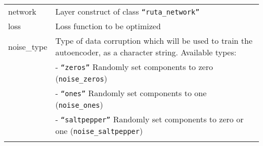 \begin{longtable}[c]{@{}>{\small}p{3cm}>{\raggedright}p{12.5cm}@{}}
\toprule
\begin{minipage}[t]{0.07\columnwidth}\raggedright\strut
network
\strut\end{minipage} &
\begin{minipage}[t]{0.87\columnwidth}\raggedright\strut
Layer construct of class \texttt{``ruta\_network''}
\strut\end{minipage}\tabularnewline
\begin{minipage}[t]{0.07\columnwidth}\raggedright\strut
loss
\strut\end{minipage} &
\begin{minipage}[t]{0.87\columnwidth}\raggedright\strut
Loss function to be optimized
\strut\end{minipage}\tabularnewline
\begin{minipage}[t]{0.07\columnwidth}\raggedright\strut
noise\_type
\strut\end{minipage} &
\begin{minipage}[t]{0.87\columnwidth}\raggedright\strut
Type of data corruption which will be used to train the autoencoder, as
a character string. Available types:
\strut\end{minipage}\tabularnewline
\begin{minipage}[t]{0.07\columnwidth}\raggedright\strut
\strut\end{minipage} &
\begin{minipage}[t]{0.87\columnwidth}\raggedright\strut
- \texttt{``zeros''} Randomly set components to zero
(\texttt{noise\_zeros})
\strut\end{minipage}\tabularnewline
\begin{minipage}[t]{0.07\columnwidth}\raggedright\strut
\strut\end{minipage} &
\begin{minipage}[t]{0.87\columnwidth}\raggedright\strut
- \texttt{``ones''} Randomly set components to one (\texttt{noise\_ones})
\strut\end{minipage}\tabularnewline
\begin{minipage}[t]{0.07\columnwidth}\raggedright\strut
\strut\end{minipage} &
\begin{minipage}[t]{0.87\columnwidth}\raggedright\strut
- \texttt{``saltpepper''} Randomly set components to zero or one
(\texttt{noise\_saltpepper})
\strut\end{minipage}\tabularnewline
\begin{minipage}[t]{0.07\columnwidth}\raggedright\strut

\end{minipage}
\end{longtable}

